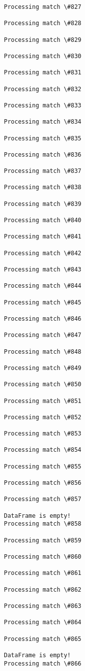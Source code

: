 \documentclass[11pt]{article}
\begin{document}
\begin{Verbatim}[commandchars=\\\{\}]
Processing match \#827

Processing match \#828

Processing match \#829

Processing match \#830

Processing match \#831

Processing match \#832

Processing match \#833

Processing match \#834

Processing match \#835

Processing match \#836

Processing match \#837

Processing match \#838

Processing match \#839

Processing match \#840

Processing match \#841

Processing match \#842

Processing match \#843

Processing match \#844

Processing match \#845

Processing match \#846

Processing match \#847

Processing match \#848

Processing match \#849

Processing match \#850

Processing match \#851

Processing match \#852

Processing match \#853

Processing match \#854

Processing match \#855

Processing match \#856

Processing match \#857

DataFrame is empty!
Processing match \#858

Processing match \#859

Processing match \#860

Processing match \#861

Processing match \#862

Processing match \#863

Processing match \#864

Processing match \#865

DataFrame is empty!
Processing match \#866


\end{Verbatim}
\end{document}
